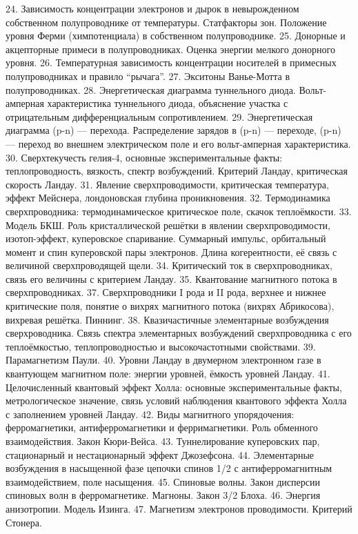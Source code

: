 24. Зависимость концентрации электронов и дырок в невырожденном собственном полупроводнике от температуры. Статфакторы зон. Положение уровня Ферми (химпотенциала) в собственном полупроводнике.
25. Донорные и акцепторные примеси в полупроводниках. Оценка энергии мелкого донорного уровня.
26. Температурная зависимость концентрации носителей в примесных полупроводниках и правило ``рычага''.
27. Экситоны Ванье-Мотта в полупроводниках.
28. Энергетическая диаграмма туннельного диода. Вольт-амперная характеристика туннельного диода, объяснение участка с отрицательным дифференциальным сопротивлением.
29. Энергетическая диаграмма (p-n) — перехода. Распределение зарядов в (p-n) — переходе, (p-n) — переход во внешнем электрическом поле и его вольт-амперная характеристика.
30. Сверхтекучесть гелия-4, основные экспериментальные факты: теплопроводность, вязкость, спектр возбуждений. Критерий Ландау, критическая скорость Ландау.
31. Явление сверхпроводимости, критическая температура, эффект Мейснера, лондоновская глубина проникновения.
32. Термодинамика сверхпроводника: термодинамическое критическое поле, скачок теплоёмкости.
33. Модель БКШ. Роль кристаллической решётки в явлении сверхпроводимости, изотоп-эффект, куперовское спаривание. Суммарный импульс, орбитальный момент и спин куперовской пары электронов. Длина когерентности, её связь с величиной сверхпроводящей щели.
34. Критический ток в сверхпроводниках, связь его величины с критерием Ландау.
35. Квантование магнитного потока в сверхпроводниках.
37. Сверхпроводники I рода и II рода, верхнее и нижнее критические поля, понятие о вихрях магнитного потока (вихрях Абрикосова), вихревая решётка. Пиннинг.
38. Квазичастичные элементарные возбуждения сверхроводника. Связь спектра элементарных возбуждений сверхпроводника с его теплоёмкостью, теплопроводностью и высокочастотными свойствами.
39. Парамагнетизм Паули.
40. Уровни Ландау в двумерном электронном газе в квантующем магнитном поле: энергии уровней, ёмкость уровней Ландау.
41. Целочисленный квантовый эффект Холла: основные экспериментальные факты, метрологическое значение, связь условий наблюдения квантового эффекта Холла с заполнением уровней Ландау.
42. Виды магнитного упорядочения: ферромагнетики, антиферромагнетики и ферримагнетики. Роль обменного взаимодействия. Закон Кюри-Вейса.
43. Туннелирование куперовских пар, стационарный и нестационарный эффект Джозефсона.
44. Элементарные возбуждения в насыщенной фазе цепочки спинов 1/2 с антиферромагнитным взаимодействием, поле насыщения.
45. Спиновые волны. Закон дисперсии спиновых волн в ферромагнетике. Магноны. Закон 3/2 Блоха.
46. Энергия анизотропии. Модель Изинга.
47. Магнетизм электронов проводимости. Критерий Стонера.	